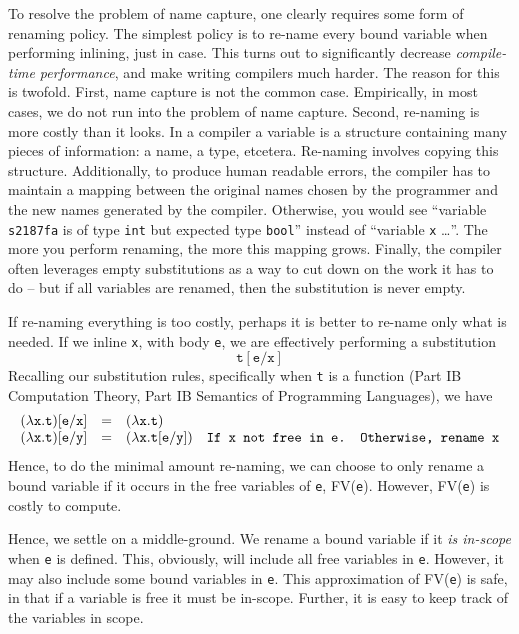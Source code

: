 To resolve the problem of name capture, one clearly requires some form of renaming policy. The simplest policy is to re-name every bound variable when performing inlining, just in case. This turns out to significantly decrease \textit{compile-time performance}, and make writing compilers much harder. The reason for this is twofold. First, name capture is not the common case. Empirically, in most cases, we do not run into the problem of name capture. Second, re-naming is more costly than it looks. In a compiler a variable is a structure containing many pieces of information: a name, a type, etcetera. Re-naming involves copying this structure. Additionally, to produce human readable errors, the compiler has to maintain a mapping between the original names chosen by the programmer and the new names generated by the compiler. Otherwise, you would see ``variable \texttt{s2187fa} is of type \texttt{int} but expected type \texttt{bool}'' instead of ``variable \texttt{x} \ldots''. The more you perform renaming, the more this mapping grows. Finally, the compiler often leverages empty substitutions as a way to cut down on the work it has to do -- but if all variables are renamed, then the substitution is never empty. 

If re-naming everything is too costly, perhaps it is better to re-name only what is needed. If we inline \texttt{x}, with body \texttt{e}, we are effectively performing a substitution
\[\texttt{t}[\texttt{e}/\texttt{x}]\]
Recalling our substitution rules, specifically when \texttt{t} is a function (\textsf{Part IB Computation Theory, Part IB Semantics of Programming Languages}), we have
\[\begin{array}{rcll}
    (\lambda \texttt{x}. \texttt{t})[\texttt{e}/\texttt{x}] & = & (\lambda \texttt{x}. \texttt{t})&\\
    (\lambda \texttt{x}. \texttt{t})[\texttt{e}/\texttt{y}] & = & (\lambda \texttt{x}. \texttt{t} [\texttt{e}/\texttt{y}]) & \texttt{If \texttt{x} not free in \texttt{e}. Otherwise, rename \texttt{x}}\\
\end{array}\]
Hence, to do the minimal amount re-naming, we can choose to only rename a bound variable if it occurs in the free variables of \texttt{e}, \textsf{FV}(\texttt{e}). However, \textsf{FV}(\texttt{e}) is costly to compute. 

Hence, we settle on a middle-ground. We rename a bound variable if it \textit{is in-scope} when \texttt{e} is defined. This, obviously, will include all free variables in \texttt{e}. However, it may also include some bound variables in \texttt{e}. This approximation of \textsf{FV}(\texttt{e}) is safe, in that if a variable is free it must be in-scope. Further, it is easy to keep track of the variables in scope. 

